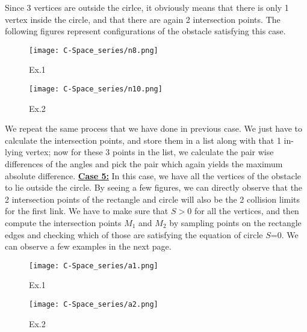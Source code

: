 \documentclass[12pt]{article}
\begin{document}
\newline
\newline
Since 3 vertices are outside the cirlce, it obviously means that there is only 1 vertex inside the circle, and that there are again 2 intersection points. The following figures represent configurations of the obstacle satisfying this case.
\begin{figure}[h!]
    \centering
    \begin{minipage}{0.48\textwidth}
        \centering
        \texttt{[image: C-Space\_series/n8.png]}
        \caption{Ex.1}
        \label{fig:n8}
    \end{minipage}
    \hfill
    \begin{minipage}{0.48\textwidth}
        \centering
        \texttt{[image: C-Space\_series/n10.png]}
        \caption{Ex.2}
        \label{fig:n10}
    \end{minipage}
\end{figure}
\newline
We repeat the same process that we have done in previous case.
We just have to calculate the intersection points, and store them in a list along with that 1 in-lying vertex; now for these 3 points in the list, we calculate the pair wise differences of the angles and pick the pair which again yields the maximum absolute difference.
\newline
\newline
\underline{\textbf{Case 5:}}
\newline
In this case, we have all the vertices of the obstacle to lie outside the circle. By seeing a few figures, we can directly observe that the 2 intersection points of the rectangle and circle will also be the 2 collision limits for the first link. We have to make sure that $S>$0 for all the vertices, and then compute the intersection points $M_1$ and $M_2$ by sampling points on the rectangle edges and checking which of those are satisfying the equation of circle $S$=0. We can observe a few examples in the next page.
\clearpage
\begin{figure}[h!]
    \centering
    \begin{minipage}{0.48\textwidth}
        \centering
        \texttt{[image: C-Space\_series/a1.png]}
        \caption{Ex.1}
        \label{fig:a1}
    \end{minipage}
    \hfill
    \begin{minipage}{0.48\textwidth}
        \centering
        \texttt{[image: C-Space\_series/a2.png]}
        \caption{Ex.2}
        \label{fig:a2}
    \end{minipage}
\end{figure}
\end{document}
